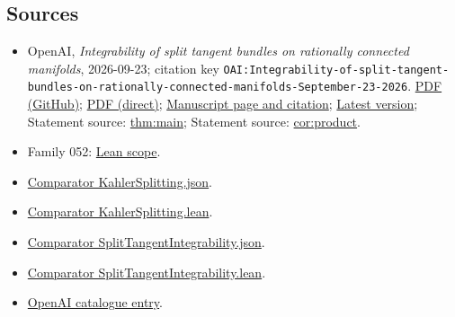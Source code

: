 \documentclass[11pt]{article}
\begin{document}
\subsection{Sources}
\begin{itemize}
\item OpenAI, \emph{Integrability of split tangent bundles on rationally connected manifolds}, 2026-09-23; citation key \texttt{OAI:Integrability-of-split-tangent-bundles-on-rationally-connected-manifolds-September-23-2026}. \href{https://github.com/openai/math/blob/adc7f1241b42e322a6451854ab7e4b4c146bf78a/preprints/Integrability-of-split-tangent-bundles-on-rationally-connected-manifolds-September-23-2026/main.pdf}{PDF (GitHub)}; \href{https://github.com/openai/math/raw/adc7f1241b42e322a6451854ab7e4b4c146bf78a/preprints/Integrability-of-split-tangent-bundles-on-rationally-connected-manifolds-September-23-2026/main.pdf}{PDF (direct)}; \href{https://github.com/openai/math/blob/adc7f1241b42e322a6451854ab7e4b4c146bf78a/preprints/Integrability-of-split-tangent-bundles-on-rationally-connected-manifolds-September-23-2026/README.md}{Manuscript page and citation}; \href{https://github.com/openai/math/blob/main/preprints/Integrability-of-split-tangent-bundles-on-rationally-connected-manifolds-September-23-2026/main.pdf}{Latest version}; Statement source: \href{https://github.com/openai/math/blob/adc7f1241b42e322a6451854ab7e4b4c146bf78a/preprints/Integrability-of-split-tangent-bundles-on-rationally-connected-manifolds-September-23-2026/build/sections/introduction.tex\#L21}{thm:main}; Statement source: \href{https://github.com/openai/math/blob/adc7f1241b42e322a6451854ab7e4b4c146bf78a/preprints/Integrability-of-split-tangent-bundles-on-rationally-connected-manifolds-September-23-2026/build/sections/introduction.tex\#L37}{cor:product}.
\item Family 052: \href{https://github.com/openai/math/blob/adc7f1241b42e322a6451854ab7e4b4c146bf78a/lean/docs/052.md}{Lean scope}.
\item \href{https://github.com/openai/math/blob/adc7f1241b42e322a6451854ab7e4b4c146bf78a/lean/ComparatorChallenges/KahlerSplitting.json}{Comparator KahlerSplitting.json}.
\item \href{https://github.com/openai/math/blob/adc7f1241b42e322a6451854ab7e4b4c146bf78a/lean/ComparatorChallenges/KahlerSplitting.lean}{Comparator KahlerSplitting.lean}.
\item \href{https://github.com/openai/math/blob/adc7f1241b42e322a6451854ab7e4b4c146bf78a/lean/ComparatorChallenges/SplitTangentIntegrability.json}{Comparator SplitTangentIntegrability.json}.
\item \href{https://github.com/openai/math/blob/adc7f1241b42e322a6451854ab7e4b4c146bf78a/lean/ComparatorChallenges/SplitTangentIntegrability.lean}{Comparator SplitTangentIntegrability.lean}.
\item \href{https://github.com/openai/math/blob/adc7f1241b42e322a6451854ab7e4b4c146bf78a/CONTENTS.md}{OpenAI catalogue entry}.
\end{itemize}
\end{document}
